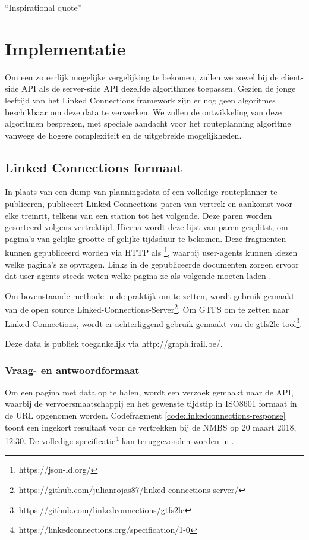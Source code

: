 \begin{savequote}[0.55\linewidth]
	``Inspirational quote''
\end{savequote}

\chapter{Implementatie}
Om een zo eerlijk mogelijke vergelijking te bekomen, zullen we zowel bij de client-side API als de server-side API dezelfde algorithmes toepassen. Gezien de jonge leeftijd van het Linked Connections framework zijn er nog geen algoritmes beschikbaar om deze data te verwerken. We zullen de ontwikkeling van deze algoritmen bespreken, met speciale aandacht voor het routeplanning algoritme vanwege de hogere complexiteit en de uitgebreide mogelijkheden.

\section{Linked Connections formaat}

In plaats van een dump van planningsdata of een volledige routeplanner te publiceren, publiceert Linked Connections paren van vertrek en aankomst voor elke treinrit, telkens van een station tot het volgende. Deze paren worden gesorteerd volgens vertrektijd. Hierna wordt deze lijst van paren gesplitst, om pagina's van gelijke grootte of gelijke tijdsduur te bekomen. Deze fragmenten kunnen gepubliceerd worden via HTTP als \footnote{https://json-ld.org/}, waarbij user-agents kunnen kiezen welke pagina's ze opvragen. Links in de gepubliceerde documenten zorgen ervoor dat user-agents steeds weten welke pagina ze als volgende moeten laden \citep{linkedconnections18}.

Om bovenstaande methode in de praktijk om te zetten, wordt gebruik gemaakt van de open source Linked-Connections-Server\footnote{https://github.com/julianrojas87/linked-connections-server/}. Om GTFS om te zetten naar Linked Connections, wordt er achterliggend gebruik gemaakt van de gtfs2lc tool\footnote{https://github.com/linkedconnections/gtfs2lc}.

Deze data is publiek toegankelijk via http://graph.irail.be/.

\subsection{Vraag- en antwoordformaat}
Om een pagina met data op te halen, wordt een verzoek gemaakt naar de API, waarbij de vervoersmaatschappij en het gewenste tijdstip in ISO8601 formaat in de URL opgenomen worden.  Codefragment \ref{code:linkedconnections-response} toont een ingekort resultaat voor de vertrekken bij de NMBS op 20 maart 2018, 12:30. De volledige specificatie\footnote{https://linkedconnections.org/specification/1-0} kan teruggevonden worden in .

